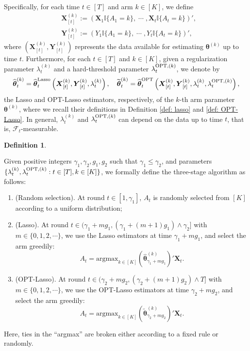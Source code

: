 \documentclass[aos,preprint]{imsart}
\theoremstyle{plain}
\theoremstyle{definition}
\newtheorem{definition}{Definition}
\newcommand{\btheta}{\boldsymbol{\theta}}
\newcommand{\hbtheta}{\widehat{\boldsymbol{\theta}}}
\newcommand{\bX}{\boldsymbol{X}}
\newcommand{\ltheta}{\hbtheta^{\textup{Lasso}}}
\newcommand{\ptheta}{\widehat{\boldsymbol{\theta}}^{\textup{OPT}}}
\newcommand{\bY}{\boldsymbol{Y}}
\newcommand{\tbtheta}{\widetilde{\boldsymbol{\theta}}}
\newcommand{\cF}{\mathcal{F}}
\begin{document}
Specifically, for each time $t \in [T]$ and arm $k \in [K]$, we define
\begin{equation*}
\begin{aligned}
    &\bX_{[t]}^{(k)} := \left(\bX_1 \mathbb{I}\{A_1 = k\},\; \cdots\;, \bX_t \mathbb{I}\{A_t = k\}\right)', \\
    &\bY_{[t]}^{(k)} := \left(Y_1 \mathbb{I}\{A_1 = k\},\; \cdots\;, Y_t \mathbb{I}\{A_t = k\}\right)',
\end{aligned}
\end{equation*}
where $(\bX_{[t]}^{(k)}, \bY_{[t]}^{(k)})$ represents the data available for estimating $\btheta^{(k)}$ up to time $t$. Furthermore, for each $t \in [T]$ and $k \in [K]$, given a regularization parameter $\lambda_t^{(k)}$ and a hard-threshold parameter $\lambda_t^{\textup{OPT},(k)}$, we denote by
\begin{equation*}
\hbtheta_t^{(k)} = \ltheta_t\left(\bX_{[t]}^{(k)}, \bY_{[t]}^{(k)}, \lambda_t^{(k)}\right), \quad \tbtheta_t^{(k)} = \ptheta_t\left(\bX_{[t]}^{(k)}, \bY_{[t]}^{(k)}, \lambda_t^{(k)}, \lambda_t^{\textup{OPT},(k)}\right), 
\end{equation*}
the Lasso and OPT-Lasso estimators, respectively, of the $k$-th arm parameter $\btheta^{(k)}$, where we recall their definitions in Definition \ref{def: lasso} and \ref{def: OPT-Lasso}. In general, $\lambda_t^{(k)}$ and $\lambda_t^{\textup{OPT},(k)}$ can depend on the data up to time $t$, that is, $\cF_t$-measurable.

\begin{definition} \label{def:three_stages}

Given positive integers $\gamma_1, \gamma_2, g_1, g_2$ such that $\gamma_1 \leq \gamma_2$, and  parameters $\{\lambda_t^{(k)}, \lambda_t^{\textup{OPT},(k)} : t \in [T], k \in [K]\}$, we formally define the three-stage algorithm as follows:
\begin{enumerate}[label={Stage \arabic*} ]
    \item (Random selection).  At round $t \in [1, \gamma_1]$, $A_t$ is randomly selected from $[K]$ according to a uniform distribution;
    \item(Lasso).  At round $t \in (\gamma_1+mg_1,(\gamma_1+(m+1)g_1) \wedge \gamma_2]$ with $m\in\{0,1,2,\cdots\}$, we use the Lasso estimators at time $\gamma_1 + m g_1$, and select the arm  greedily:
    $$A_t = \text{argmax}_{k\in[K]} (\hbtheta_{\gamma_1+mg_1}^{(k)})' \bX_t.$$
    \item(OPT-Lasso).   At round $t \in (\gamma_2+mg_2,(\gamma_2+(m+1)g_2) \wedge T]$ with $m\in\{0,1,2,\cdots\}$, we use the OPT-Lasso estimators at time $\gamma_2 + m g_2$, and select the arm  greedily:
    $$A_t = \text{argmax}_{k\in[K]} (\tbtheta_{\gamma_2+mg_2}^{(k)})' \bX_t.$$ 
\end{enumerate}
Here, ties in the “argmax” are broken either according to a fixed rule or randomly.
\end{definition}  
\end{document}
